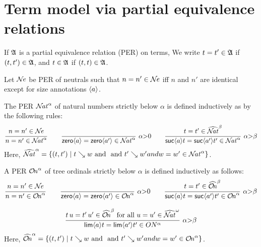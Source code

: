\documentclass[acmsmall,screen]{acmart}\settopmatter{}
\begin{document}
\section{Term model via partial equivalence relations}

If $\AA$ is a partial equivalence relation (PER) on terms, We write $t = t'
\in \AA$ if $(t,t') \in \AA$, and $t \in \AA$ if $(t,t) \in \AA$.

Let $\NE$ be PER of neutrals such that $n = n' \in \NE$ iff $n$ and
$n'$ are identical except for size annotations $\ann a$.

The PER $\NAT^\alpha$ of natural numbers
strictly below $\alpha$ is defined inductively as by the following
rules:
\[
  \ru{n = n' \in \NE
    }{n = n' \in \NAT^\alpha}
\qquad
  \rux{
     }{\zero a = \zero {a'} \in \NAT^{\alpha}
     }{\alpha {>} 0}
\qquad
  \rux{t = t' \in \NAThat^{\beta}
     }{\suc a t = \suc{a'}{t'} \in \NAT^{\alpha}
     }{\alpha {>} \beta}
\]
Here,
$\NAThat^\alpha = \{ (t,t') \mid t \evalsto w \mand \mand t' \evalsto
w' and w = w' \in \NAT^\alpha \}$.

A PER $\ON^\alpha$ of tree ordinals strictly below $\alpha$
is defined inductively as follows:
\begin{gather*}
  \ru{n = n' \in \NE
    }{n = n' \in \ON^\alpha}
\qquad
  \rux{
     }{\zero a = \zero{a'} \in \ON^{\alpha}
     }{\alpha {>} 0}
\qquad
  \rux{t = t' \in \ONhat^{\beta}
     }{\suc a t = \suc{a'}{t'} \in \ON^{\alpha}
     }{\alpha {>} \beta}
\\[2ex]
  \rux{t\,u = t'\,u' \in \ONhat^{\beta} \mforall u = u' \in \NAThat^\omega
     }{\lim a t = \lim{a'}{t'} \in ON^{\alpha}
     }{\alpha{>}\beta}
\end{gather*}
Here,
$\ONhat^\alpha  = \{ (t,t') \mid t \evalsto w \mand \mand t' \evalsto
w' and w = w' \in \ON^\alpha \}$.
\end{document}
